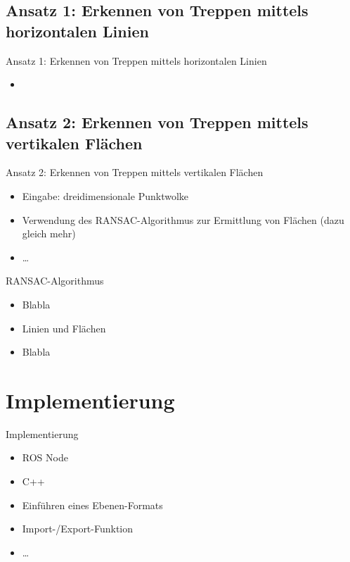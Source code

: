 \documentclass[18pt]{beamer}
\begin{document}
\subsection{Ansatz 1: Erkennen von Treppen mittels horizontalen Linien}
\begin{frame}{Ansatz 1: Erkennen von Treppen mittels horizontalen Linien}
\begin{itemize}
	\item
\end{itemize}
\end{frame}


\subsection{Ansatz 2: Erkennen von Treppen mittels vertikalen Flächen}
\begin{frame}{Ansatz 2: Erkennen von Treppen mittels vertikalen Flächen}
\begin{itemize}
	\item Eingabe: dreidimensionale Punktwolke
	\item Verwendung des RANSAC-Algorithmus zur Ermittlung von Flächen (dazu gleich mehr)
	\item \dots
\end{itemize}
\end{frame}

\begin{frame}{RANSAC-Algorithmus}
\begin{itemize}
	\item Blabla
	\item Linien und Flächen
	\item Blabla
\end{itemize}
\end{frame}



\section{Implementierung}

\begin{frame}{Implementierung}
\begin{itemize}
	\item ROS Node
	\item C++
	\item Einführen eines Ebenen-Formats
	\item Import-/Export-Funktion
	\item \dots
\end{itemize}
\end{frame}
\end{document}
